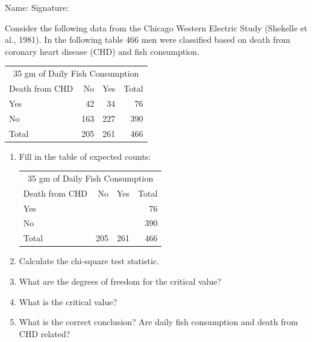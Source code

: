 \documentclass[11pt, chapterprefix=true]{scrbook}\usepackage[]{graphicx}\usepackage[]{color}
\begin{document}
\begin{exercises}
\begin{exercise}
\begin{center}
{{\vspace{4mm}
Name: \underline{\phantom{xxxxxxxxxxxxxxxxxxxxxxxx}} Signature: \underline{\phantom{xxxxxxxxxxxxxxxxxxxxxxxx}}
 }}
\end{center}

Consider the following data from the Chicago Western Electric Study (Shekelle et al., 1981). In the following table 466 men were classified based on death from coronary heart disease (CHD) and fish consumption.
			
\begin{table}[ht]
\centering
\begin{tabular}{@{} l rrr @{}} %
  \multicolumn{4}{c}{35 gm of Daily Fish Consumption} \\		
Death from CHD &	No &	Yes &	Total \\ \hline
Yes &	42 &	34 &	76 \\
No &	163 &	227 &	390 \\ \hline
Total &	205 &	261 &	466 \\ \hline
\end{tabular}
\end{table}

\begin{enumerate}
  \item Fill in the table of expected counts:

\begin{center}

\begin{tabular}{@{} lrrr @{}} %
  \multicolumn{4}{c}{35 gm of Daily Fish Consumption} \\		
Death from CHD &	No &	Yes &	Total \\ \hline
Yes &	&	&	76 \\
No &	&	&	390 \\ \hline
Total &	205&	261&	466 \\ \hline
\end{tabular}

\end{center}

  \item	Calculate the chi-square test statistic.
  \item	What are the degrees of freedom for the critical value?
  \item	What is the critical value?
  \item	What is the correct conclusion?  Are daily fish consumption and death from CHD related?
\end{enumerate}


\end{exercise}
\end{exercises}
\end{document}
